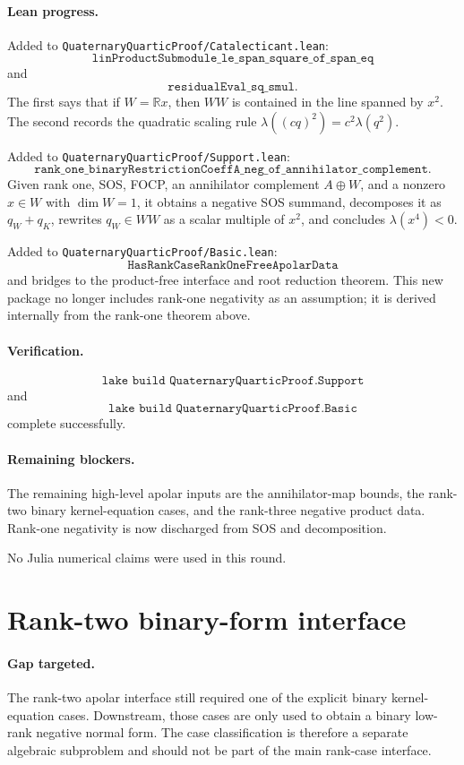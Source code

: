 \documentclass[11pt]{article}
\begin{document}
\paragraph{Lean progress.}
Added to \texttt{QuaternaryQuarticProof/Catalecticant.lean}:
\[
\texttt{linProductSubmodule\_le\_span\_square\_of\_span\_eq}
\]
and
\[
\texttt{residualEval\_sq\_smul}.
\]
The first says that if \(W=\mathbb R x\), then \(WW\) is contained in the line
spanned by \(x^2\).  The second records the quadratic scaling rule
\(\lambda((c q)^2)=c^2\lambda(q^2)\).

Added to \texttt{QuaternaryQuarticProof/Support.lean}:
\[
\texttt{rank\_one\_binaryRestrictionCoeffA\_neg\_of\_annihilator\_complement}.
\]
Given rank one, SOS, FOCP, an annihilator complement \(A\oplus W\), and a
nonzero \(x\in W\) with \(\dim W=1\), it obtains a negative SOS summand,
decomposes it as \(q_W+q_K\), rewrites \(q_W\in WW\) as a scalar multiple of
\(x^2\), and concludes \(\lambda(x^4)<0\).

Added to \texttt{QuaternaryQuarticProof/Basic.lean}:
\[
\texttt{HasRankCaseRankOneFreeApolarData}
\]
and bridges to the product-free interface and root reduction theorem.  This
new package no longer includes rank-one negativity as an assumption; it is
derived internally from the rank-one theorem above.

\paragraph{Verification.}
\[
\texttt{lake build QuaternaryQuarticProof.Support}
\]
and
\[
\texttt{lake build QuaternaryQuarticProof.Basic}
\]
complete successfully.

\paragraph{Remaining blockers.}
The remaining high-level apolar inputs are the annihilator-map bounds, the
rank-two binary kernel-equation cases, and the rank-three negative product
data.  Rank-one negativity is now discharged from SOS and decomposition.

No Julia numerical claims were used in this round.

\section*{Rank-two binary-form interface}

\paragraph{Gap targeted.}
The rank-two apolar interface still required one of the explicit binary
kernel-equation cases.  Downstream, those cases are only used to obtain a
binary low-rank negative normal form.  The case classification is therefore a
separate algebraic subproblem and should not be part of the main rank-case
interface.
\end{document}
